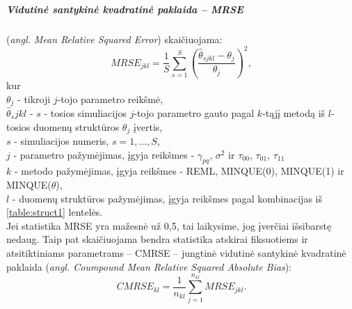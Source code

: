 \documentclass[11pt,a4paper]{article}
\begin{document}
\subparagraph{Vidutinė santykinė kvadratinė paklaida -- MRSE } (\textit{angl.  Mean Relative Squared Error}) skaičiuojama: 
\[
MRSE_{jkl}=\frac{1}{S}\sum_{s=1}^S\left(\frac{\hat{\theta}_{sjkl}-\theta_j}{\theta_j}\right)^2,
\]
kur \\
$\theta_j$ - tikroji $j$-tojo parametro reikšmė, \\
$\hat{\theta}_sjkl$ - $s$ - tosios simuliacijos $j$-tojo parametro gauto pagal $k$-tąjį metodą iš $l$-tosios duomenų struktūros $\theta_j$ įvertis,\\
$s$ - simuliacijos numeris, $s=1,\dots,S$,\\
$j$ - parametro pažymėjimas, įgyja reikšmes - $\gamma_{pq}$, $\sigma^2$ ir $\tau_{00}$,  $\tau_{01}$,  $\tau_{11}$\\
$k$ - metodo pažymėjimas, įgyja reikšmes - REML, MINQUE(0), MINQUE(1) ir MINQUE($\theta$),\\
$l$ - duomenų struktūros pažymėjimas, įgyja reikšmes pagal kombinacijas iš \ref{table:struct1} lentelės.\\
\indent Jei statistika MRSE yra mažesnė už 0,5, tai laikysime, jog įverčiai išsibarstę nedaug. Taip pat skaičiuojama bendra statistika atskirai fiksuotiems ir atsitiktiniams parametrams -- CMRSE -- jungtinė vidutinė santykinė kvadratinė paklaida (\textit{angl. Coumpound Mean Relative Squared Absolute Bias}):
\[
CMRSE_{kl}=\frac{1}{n_{kl}}\sum_{j=1}^{n_{kl}}MRSE_{jkl}.
\]
\end{document}
